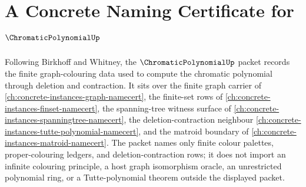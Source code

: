 \chapter{A Concrete Naming Certificate for $\ChromaticPolynomialUp$}
\label{ch:concrete-instances-chromatic-polynomial-namecert}

Following Birkhoff and Whitney, the $\ChromaticPolynomialUp$ packet records the finite graph-colouring data used to compute the chromatic polynomial through deletion and contraction. It sits over the finite graph carrier of \autoref{ch:concrete-instances-graph-namecert}, the finite-set rows of \autoref{ch:concrete-instances-finset-namecert}, the spanning-tree witness surface of \autoref{ch:concrete-instances-spanningtree-namecert}, the deletion-contraction neighbour \autoref{ch:concrete-instances-tutte-polynomial-namecert}, and the matroid boundary of \autoref{ch:concrete-instances-matroid-namecert}. The packet names only finite colour palettes, proper-colouring ledgers, and deletion-contraction rows; it does not import an infinite colouring principle, a host graph isomorphism oracle, an unrestricted polynomial ring, or a Tutte-polynomial theorem outside the displayed packet.

